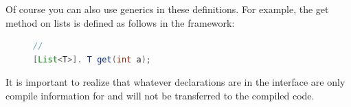 Of course you can also use generics in these definitions. For example, the get method on lists is defined as follows in the \vonda framework:

\begin{figure}[htbp]
\centering
\begin{lstlisting}[language=Java]
//
[List<T>]. T get(int a);
\end{lstlisting}
\end{figure}
%


It is important to realize that whatever declarations are in the interface are only compile information for \vonda and will not be transferred to the compiled code.



